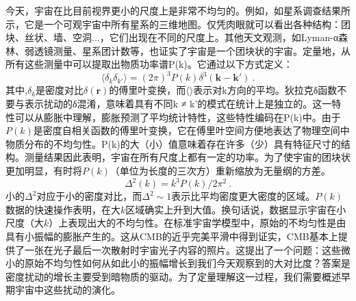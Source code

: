 
今天，宇宙在比目前视界更小的尺度上是非常不均匀的。例如，如星系调查结果所示，它是一个可观宇宙中所有星系的三维地图。仅凭肉眼就可以看出各种结构：团块、丝状、墙、空洞...，它们出现在不同的尺度上。其他天文观测，如Lyman-α森林、弱透镜测量、星系团计数等，也证实了宇宙是一个团块状的宇宙。定量地，从所有这些测量中可以提取出物质功率谱P(k)。它通过以下方式定义：
\begin{equation}
\langle \delta_k \delta_{k'} \rangle = (2\pi)^3 P(k) \delta^3(\mathbf k - \mathbf k')~.
\end{equation}
其中,$\delta_k$是密度对比$\delta(\mathbf r)$的傅里叶变换，而$\langle\rangle$表示对k方向的平均。狄拉克δ函数不要与表示扰动的δ混淆，意味着具有不同k ≠ k'的模式在统计上是独立的。这一特性可以从膨胀中理解，膨胀预测了平均统计特性，这些特性编码在P(k)中。由于$P(k)$是密度自相关函数的傅里叶变换，它在傅里叶空间方便地表达了物理空间中物质分布的不均匀性。P(k)的大（小）值意味着存在许多（少）具有特征尺寸的结构。测量结果因此表明，宇宙在所有尺度上都有一定的功率。为了使宇宙的团块状更加明显，有时将$P(k)$（单位为长度的三次方）重新缩放为无量纲的方差。
\begin{equation}
\Delta^2(k) = k^3 P(k) /2\pi^2~.
\end{equation}
小的$\Delta^2$对应于小的密度对比，而$\Delta^2\sim 1$表示比平均密度更大密度的区域。$P(k)$数据的快速操作表明，在大$k$区域确实上升到大值。换句话说，数据显示宇宙在小尺度（大$k$）上表现出大的不均匀性。在标准宇宙学模型中，原始的不均匀性是由具有小振幅的膨胀产生的。这从CMB的近乎完美平滑中得到证实，CMB基本上提供了一张在光子最后一次散射时宇宙光子内容的照片。这提出了一个问题：这些微小的原始不均匀性如何从如此小的振幅增长到我们今天观察到的大对比度？答案是密度扰动的增长主要受到暗物质的驱动。为了定量理解这一过程，我们需要概述早期宇宙中这些扰动的演化。

